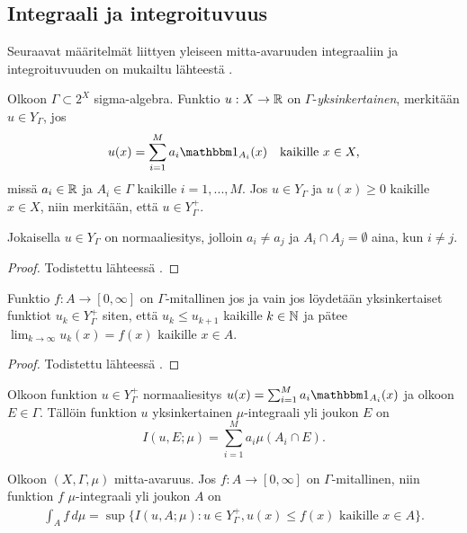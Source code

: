 \documentclass[12pt,oneside,a4paper]{amsbook} %
\begin{document}
\subsection{Integraali ja integroituvuus}
Seuraavat määritelmät liittyen yleiseen mitta-avaruuden integraaliin ja integroituvuuden on mukailtu lähteestä \cite[s. 110-111]{lehrbäck}. 
\begin{definition}
    Olkoon $\Gamma \subset 2^X$ sigma-algebra. Funktio $u: X \to \mathbb{R}$ on $\Gamma$-\textit{yksinkertainen}, merkitään $u \in Y_\Gamma$, jos
    \begin{align*}
        u(x) = \sum_{i=1}^M a_i \indfct{A_i}(x) \quad \text{kaikille } x \in X,
    \end{align*}
    missä $a_i \in \mathbb{R}$ ja $A_i \in \Gamma$ kaikille $i = 1, ..., M.$ Jos $u \in Y_\Gamma$ ja $u(x) \ge 0$ kaikille $x \in X$, niin merkitään, että $u \in Y_\Gamma^+$.
\end{definition}

\begin{lemma}
    Jokaisella $u \in Y_\Gamma$ on normaaliesitys, jolloin $a_i \ne a_j$ ja $A_i \cap A_j = \emptyset$ aina, kun $i \ne j$.
\end{lemma}
\begin{proof}
    Todistettu lähteessä \cite[s. 110]{lehrbäck}.
\end{proof}

\begin{lemma}
    Funktio $f: A \to [0, \infty]$ on $\Gamma$-mitallinen jos ja vain jos löydetään yksinkertaiset funktiot $u_k \in Y_\Gamma^+$ siten, että $u_k \le u_{k+1}$ kaikille $k \in \mathbb{N}$ ja pätee $\lim_{k\to\infty}u_k(x) = f(x)$ kaikille $x \in A$.
\end{lemma}
\begin{proof}
    Todistettu lähteessä \cite[s. 110]{lehrbäck}.
\end{proof}

\begin{definition}
    Olkoon funktion $u \in Y_\Gamma^+$ normaaliesitys $u(x) = \sum_{i=1}^M a_i\indfct{A_i}(x)$ ja olkoon $E \in \Gamma$. Tällöin funktion $u$ yksinkertainen $\mu$-integraali yli joukon $E$ on
    \begin{equation*}
        I(u, E; \mu) = \sum_{i=1}^M a_i \mu(A_i \cap E).
    \end{equation*}
\end{definition}

\begin{definition}
    Olkoon $(X, \Gamma, \mu)$ mitta-avaruus. Jos $f: A \to [0, \infty]$ on $\Gamma$-mitallinen, niin funktion $f$ $\mu$-integraali yli joukon $A$ on
    \begin{align*}
        \int_A f \, d\mu = \sup\{I(u, A; \mu) : u \in Y_\Gamma^+, u(x) \le f(x) \text{ kaikille } x \in A\}.
    \end{align*}
\end{definition}
\end{document}
